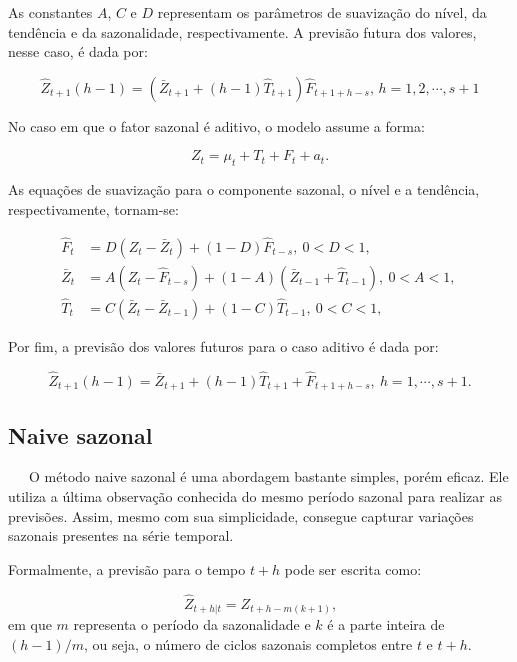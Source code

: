 \documentclass[
  12pt,
  a4paper,
]{scrreprt}
\begin{document}
As constantes \(A\), \(C\) e \(D\) representam os parâmetros de
suavização do nível, da tendência e da sazonalidade, respectivamente. A
previsão futura dos valores, nesse caso, é dada por:

\[
\hat{Z}_{t+1}\left(h - 1\right) = \left(\bar{Z}_{t+1} + \left(h - 1\right)\hat{T}_{t+1}\right)\hat{F}_{t+1+h - s} \text{, } h = 1, 2, \cdots, s + 1
\]

\vspace{12pt}

No caso em que o fator sazonal é aditivo, o modelo assume a forma:

\[
Z_{t} = \mu_{t} + T_{t} + F_{t} + a_{t}.
\]

As equações de suavização para o componente sazonal, o nível e a
tendência, respectivamente, tornam-se:

\[
\begin{aligned}
\hat{F}_{t} &= D \left(Z_{t} - \bar{Z}_{t}\right) + \left(1 - D\right) \hat{F}_{t-s}, \ 0 < D< 1 \text{, } \\
\bar{Z}_{t} &= A \left(Z_{t} - \hat{F}_{t-s}\right) + \left(1 - A\right)\left(\bar{Z}_{t-1} + \hat{T}_{t-1}\right), \ 0<A<1 \text{, } \\
\hat{T}_{t} &= C\left(\bar{Z}_{t} - \bar{Z}_{t -1}\right) + \left(1 - C\right)\hat{T}_{t - 1}, \ 0< C <1 \text{, }
\end{aligned}
\]

Por fim, a previsão dos valores futuros para o caso aditivo é dada por:

\[
\hat{Z}_{t+1}\left(h - 1\right) = \bar{Z}_{t + 1} + \left(h - 1\right)\hat{T}_{t+1}+\hat{F}_{t + 1 + h - s}, \ h=1,\cdots, s+1 \text{.}
\]

\subsection{Naive sazonal}\label{naive-sazonal}

~~~O método naive sazonal é uma abordagem bastante simples, porém
eficaz. Ele utiliza a última observação conhecida do mesmo período
sazonal para realizar as previsões. Assim, mesmo com sua simplicidade,
consegue capturar variações sazonais presentes na série temporal.

\vspace{12pt}

Formalmente, a previsão para o tempo \(t + h\) pode ser escrita como:

\[
\hat{Z}_{t+h|t} = Z_{t+h-m\left(k+1\right)} \text{,}
\] em que \(m\) representa o período da sazonalidade e \(k\) é a parte
inteira de \(\left(h - 1\right)/m\), ou seja, o número de ciclos
sazonais completos entre \(t\) e \(t + h\).
\end{document}
